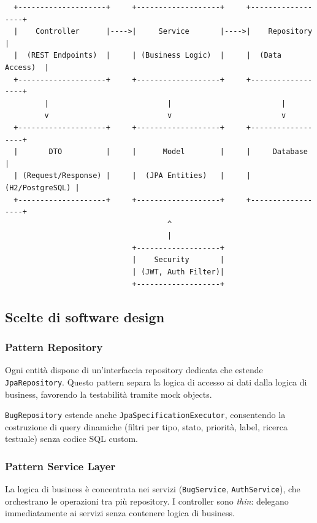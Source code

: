 \begin{verbatim}
  +--------------------+     +-------------------+     +------------------+
  |    Controller      |---->|     Service       |---->|    Repository    |
  |  (REST Endpoints)  |     | (Business Logic)  |     |  (Data Access)  |
  +--------------------+     +-------------------+     +------------------+
         |                           |                         |
         v                           v                         v
  +--------------------+     +-------------------+     +------------------+
  |       DTO          |     |      Model        |     |     Database     |
  | (Request/Response) |     |  (JPA Entities)   |     |  (H2/PostgreSQL) |
  +--------------------+     +-------------------+     +------------------+
                                     ^
                                     |
                             +-------------------+
                             |    Security       |
                             | (JWT, Auth Filter)|
                             +-------------------+
\end{verbatim}


\subsection{Scelte di software design}

\subsubsection{Pattern Repository}
Ogni entità dispone di un'interfaccia repository dedicata che estende
\texttt{JpaRepository}. Questo pattern separa la logica di accesso ai dati
dalla logica di business, favorendo la testabilità tramite mock objects.

\texttt{BugRepository} estende anche \texttt{JpaSpecificationExecutor},
consentendo la costruzione di query dinamiche (filtri per tipo, stato,
priorità, label, ricerca testuale) senza codice SQL custom.

\subsubsection{Pattern Service Layer}
La logica di business è concentrata nei servizi (\texttt{BugService},
\texttt{AuthService}), che orchestrano le operazioni tra più repository.
I controller sono \emph{thin}: delegano immediatamente ai servizi senza
contenere logica di business.

